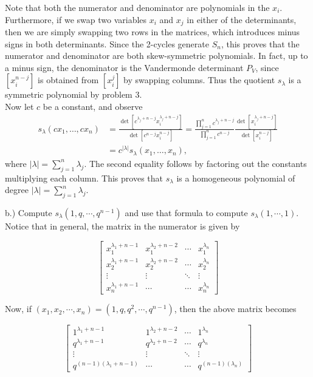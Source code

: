 \documentclass[12pt]{article}
\begin{document}
Note that both the numerator and denominator are polynomials in the $x_i$. Furthermore, if we swap two variables $x_i$ and $x_j$ in either of the determinants, then we are simply swapping two rows in the matrices, which introduces minus signs in both determinants. Since the 2-cycles generate $S_n$, this proves that the numerator and denominator are both skew-symmetric polynomials. In fact, up to a minus sign, the denominator is the Vandermonde determinant $P_V$, since $[x_i^{n-j}]$ is obtained from $[x_i^j]$ by swapping columns. Thus the quotient $s_\lambda$ is a symmetric polynomial by problem 3.\\

Now let $c$ be a constant, and observe
\begin{align*}
s_\lambda(cx_1,\dots,cx_n) &= \frac{\det[c^{\lambda_j+n-j}x_i^{\lambda_j+n-j}]}{\det[c^{n-j}x_i^{n-j}]} = \frac{\prod_{j=1}^n c^{\lambda_j+n-j}}{\prod_{j=1}^n c^{n-j}} \frac{\det[x_i^{\lambda_j+n-j}]}{\det[x_i^{n-j}]}\\
&= c^{|\lambda|} s_\lambda(x_1,\dots,x_n),
\end{align*}
where $|\lambda| = \sum_{j=1}^n \lambda_j$. The second equality follows by factoring out the constants multiplying each column. This proves that $s_\lambda$ is a homogeneous polynomial of degree $|\lambda| = \sum_{j=1}^n \lambda_j$.


b.) Compute $s_\lambda(1, q, \cdots, q^{n-1}
)$ and use that formula to compute $s_\lambda (1, \cdots, 1)$.\\

Notice that in general, the matrix in the numerator is given by

$$\begin{bmatrix} x_1^{\lambda_1 + n - 1} & x_1^{\lambda_2 + n - 2} &  \cdots & x_1^{\lambda_n} \\
x_2^{\lambda_1 + n - 1} & x_2^{\lambda_2 + n - 2} & \cdots & x_2^{\lambda_n} \\
\vdots & \vdots & \ddots & \vdots \\
x_n^{\lambda_1 + n - 1} & \cdots & \cdots & x_n^{\lambda_n} 
\end{bmatrix}$$

Now, if $(x_1, x_2, \cdots, x_n) = (1, q, q^2, \cdots, q^{n-1})$, then the above matrix becomes

$$\begin{bmatrix} 1^{\lambda_1 + n - 1} & 1^{\lambda_2 + n - 2} &  \cdots & 1^{\lambda_n} \\
q^{\lambda_1 + n - 1} & q^{\lambda_2 + n - 2} & \cdots & q^{\lambda_n} \\
\vdots & \vdots & \ddots & \vdots \\
q^{(n-1)(\lambda_1 + n - 1)} & \cdots & \cdots & q^{(n-1)(\lambda_n)} 
\end{bmatrix}
$$
\end{document}
